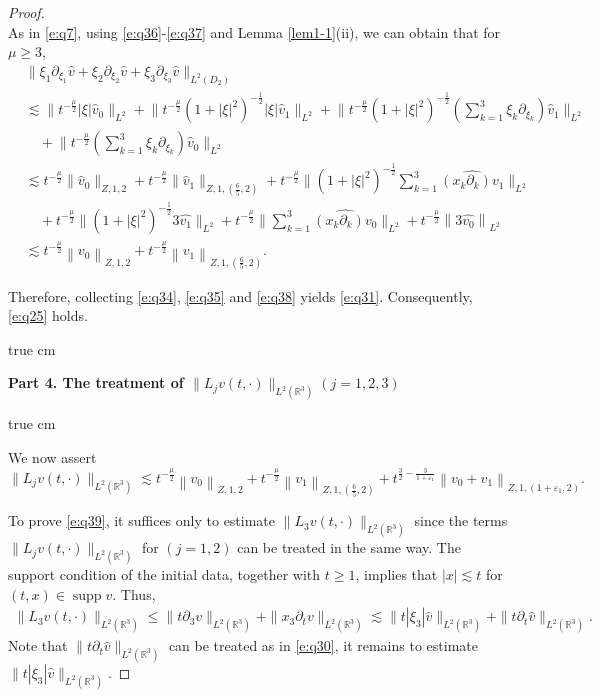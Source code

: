 \documentclass[10pt,a4paper]{amsart}
\newcommand{\R}{\mathbb R}
\newcommand{\f}{\frac}
\newcommand{\p}{\partial}
\begin{document}
\begin{proof}
\begin{equation}
\end{equation}
As in \eqref{e:q7}, using \eqref{e:q36}-\eqref{e:q37} and  Lemma \ref{lem1-1}(ii), we can obtain that for $\mu\geq3$,
\begin{equation}\label{e:q38}
\begin{aligned}
&\big\|\xi_1\p_{\xi_1}\hat{v}+\xi_2\p_{\xi_2}\hat{v}+\xi_3\p_{\xi_3}\hat{v}\big\|_{L^2(D_2)}
\\
&\lesssim \big\|t^{-\frac{\mu}{2}}|\xi|\hat{v}_{0}\big\|_{L^{2}}+ \big\|t^{-\frac{\mu}{2}}(1+|\xi|^2)^{-\f12}|\xi|\hat{v}_{1}\big\|_{L^{2}}+ \big\|t^{-\f{\mu}{2}}(1+|\xi|^2)^{-\f12}(\sum_{k=1}^3\xi_k\p_{\xi_k})\hat{v}_{1}\big\|_{L^{2}}\\
&\quad +\big\|t^{-\f{\mu}{2}}(\sum_{k=1}^3\xi_k\p_{\xi_k})\hat{v}_{0}\big\|_{L^{2}}\\
& \lesssim t^{-\frac{\mu}{2}}\big\|\hat{v}_{0}\big\|_{Z, 1, 2}+ t^{-\frac{\mu}{2}}\big\|\hat{v}_{1}\big\|_{Z, 1, (\f{6}{5}, 2)}+ t^{-\f{\mu}{2}}
\big\|(1+|\xi|^2)^{-\f{1}{2}}\sum_{k=1}^3\widehat{(x_k\p_k)v_1}\big\|_{L^{2}}\\
&\quad+ t^{-\f{\mu}{2}} \big\|(1+|\xi|^2)^{-\f{1}{2}}3\widehat{v_1}\big\|_{L^{2}}+t^{-\f{\mu}{2}} \big\|\sum_{k=1}^3\widehat{(x_k\p_k)v_0}\big\|_{L^{2}}+ t^{-\f{\mu}{2}} \left\|3\widehat{v_0}\right\|_{L^{2}}\\
&\lesssim  t^{-\f{\mu}{2}}\left\|v_0\right\|_{Z, 1, 2}+t^{-\f{\mu}{2}}\left\|v_1\right\|_{Z, 1,(\f65, 2)}.
\end{aligned}
\end{equation}



Therefore, collecting \eqref{e:q34}, \eqref{e:q35} and \eqref{e:q38} yields \eqref{e:q31}. Consequently, \eqref{e:q25} holds.

 true cm

{\bf Part 4.  The treatment  of $\|L_jv(t, \cdot)\|_{L^2(\R^3)}(j=1, 2, 3)$ }

 true cm

We now assert
\begin{equation}\label{e:q39}
\|L_jv(t, \cdot)\|_{L^2(\R^3)} \lesssim t^{-\f{\mu}{2}}\left\|v_0\right\|_{Z, 1, 2}+t^{-\f{\mu}{2}}\left\|v_1\right\|_{Z, 1,(\f65, 2)}+t^{\f32-\f{3}{1+\varepsilon_1}}\left\|v_0+v_1\right\|_{Z, 1,(1+\varepsilon_1, 2)}.
\end{equation}


To prove \eqref{e:q39}, it  suffices only to estimate $\|L_3v(t, \cdot)\|_{L^2(\R^3)}$ since the terms $\|L_jv(t, \cdot)\|_{L^2(\R^3)}$ for $(j=1,2)$ can be treated in the same way. The support condition of the initial data, together with $t\geq1$, implies that $|x|\lesssim t$
for $(t, x)\in \operatorname{supp}v$. Thus,
\begin{equation}\label{e:q40}
\begin{aligned}
\|L_3v(t, \cdot)\|_{L^2(\R^3)}\leq \|t\p_3v\|_{L^2(\R^3)}+\|x_3\p_tv\|_{L^2(\R^3)}
\lesssim \|t|\xi_3|\hat{v}\|_{L^2(\R^3)}+\|t\p_t\hat{v}\|_{L^2(\R^3)}.
\end{aligned}
\end{equation}
Note that $\|t\p_t\hat{v}\|_{L^2(\R^3)}$ can be treated as in \eqref{e:q30},
it remains to estimate $\|t|\xi_3|\hat{v}\|_{L^2(\R^3)}$.


\end{proof}
\end{document}
